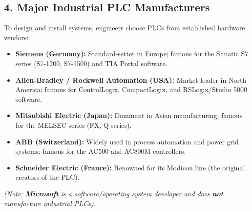\subsection{4. Major Industrial PLC Manufacturers}
To design and install systems, engineers choose PLCs from established hardware vendors:
\begin{itemize}
  \item   \textbf{Siemens (Germany):} Standard-setter in Europe; famous for the Simatic S7 series (S7-1200, S7-1500) and TIA Portal software.
  \item   \textbf{Allen-Bradley / Rockwell Automation (USA):} Market leader in North America; famous for ControlLogix, CompactLogix, and RSLogix/Studio 5000 software.
  \item   \textbf{Mitsubishi Electric (Japan):} Dominant in Asian manufacturing; famous for the MELSEC series (FX, Q-series).
  \item   \textbf{ABB (Switzerland):} Widely used in process automation and power grid systems; famous for the AC500 and AC800M controllers.
  \item   \textbf{Schneider Electric (France):} Renowned for its Modicon line (the original creators of the PLC).
\end{itemize}

\textit{(Note: \textbf{Microsoft} is a software/operating system developer and does \textbf{not} manufacture industrial PLCs).}

